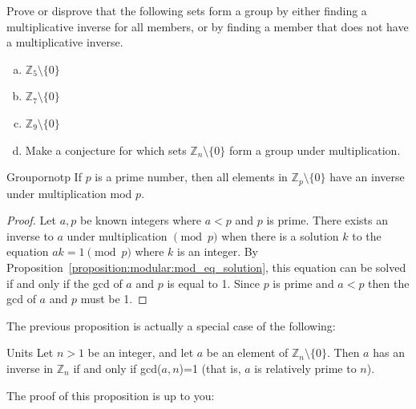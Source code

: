 \begin{exercise}{90}
Prove or disprove that the following sets form a group by either finding a multiplicative inverse for all members, or by finding a member that does not have a multiplicative inverse.
\begin{enumerate}[(a)]
\item
$\mathbb{Z}_5\setminus \{0\}$
\item
$\mathbb{Z}_7\setminus \{0\}$
\item
$\mathbb{Z}_9\setminus \{0\}$
\item
Make a conjecture for which sets $\mathbb{Z}_n \setminus \{0\}$ form a group under multiplication.
\end{enumerate}
\end{exercise}


\begin{prop}{Groupornotp}
If  $p$ is a prime number, then all elements in $\mathbb{Z}_p \setminus \{0\}$ have an inverse under multiplication mod $p$. 
\end{prop}
\begin{proof}
Let $a,p$ be known integers where $a < p$ and $p$ is prime.  There exists an inverse to $a$ under multiplication $\pmod p$ when there is a solution $k$  to the equation $ak = 1 \pmod p$ where $k$ is an integer.  By Proposition~\ref{proposition:modular:mod_eq_solution}, this equation can be solved if and only if the gcd of $a$ and $p$ is equal to 1.  Since $p$ is prime and $a<p$ then the gcd of $a$ and $p$ must be 1.
\end{proof}

The previous proposition is actually a special case of the following:

\begin{prop}{Units}
Let $n>1$ be an integer, and let  $a$ be an element of  $\mathbb{Z}_n \setminus \{0\}$. Then $a$ has an inverse in $\mathbb{Z}_n$  if and only if gcd($a,n$)=1  (that is, $a$ is relatively prime to $n$).
\end{prop}
The proof of this proposition is up to you:

